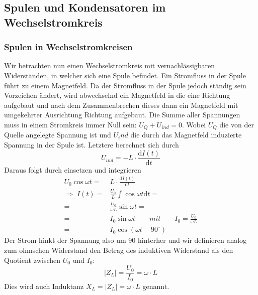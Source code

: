 \subsection{Spulen und Kondensatoren im Wechselstromkreis}

\subsubsection{Spulen in Wechselstromkreisen}
Wir betrachten nun einen Wechselstromkreis mit vernachlässigbaren Widerständen, in welcher sich eine Spule befindet. Ein Stromfluss in der Spule führt zu einem Magnetfeld. Da der Stromfluss in der Spule jedoch ständig sein Vorzeichen ändert, wird abwechselnd ein Magnetfeld in die eine Richtung aufgebaut und nach dem Zusammenbrechen dieses dann ein Magnetfeld mit umgekehrter Ausrichtung Richtung aufgebaut.
Die Summe aller Spannungen muss in einem Stromkreis immer Null sein:
$ U_Q + U_{ind} = 0 $.
Wobei $U_Q$ die von der Quelle angelegte Spannung ist und $U_ind$ die durch das Magnetfeld induzierte Spannung in der Spule ist. Letztere berechnet sich durch
\begin{equation}
U_{ind} = - L \cdot \frac{\mathrm dI(t)}{\mathrm dt}
\end{equation}
Daraus folgt durch einsetzen und integrieren
\begin{align}
U_0 \cos \omega t =& L \cdot \frac{\mathrm dI(t)}{\mathrm dt} \nonumber \\ 
\Rightarrow\; I(t) =& \frac{U_0}{L} \int \cos \omega t \mathrm dt = \nonumber \\ 
=& \frac{U_0}{\omega L} \sin \omega t = \nonumber\\
=& I_0 \sin \omega t \qquad mit\qquad I_0 = \frac{U_0}{\omega L}  \nonumber\\
=& I_0 \cos(\omega t - 90^\circ)
\end{align}
Der Strom hinkt der Spannung also um \unit{90}{\degree} hinterher und wir definieren analog zum ohmschen Widerstand den Betrag des induktiven Widerstand als den Quotient zwischen $U_0$ und $I_0$:
\begin{equation}
\left|Z_L\right| = \frac{U_0}{I_0} = \omega \cdot L
\end{equation}
Dies wird auch Induktanz $X_L = \left|Z_L\right| = \omega \cdot L$ genannt.

